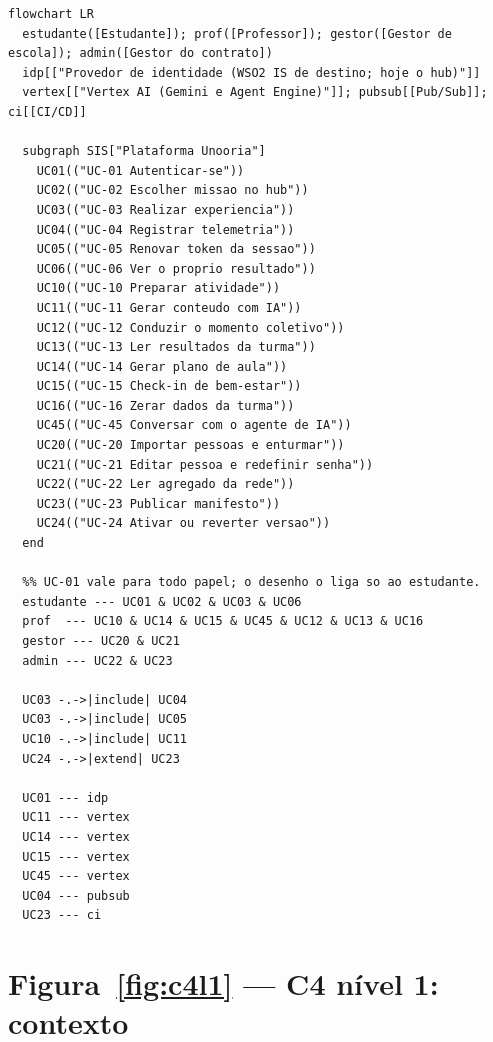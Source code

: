 \begin{lstlisting}[language=mermaid]
flowchart LR
  estudante([Estudante]); prof([Professor]); gestor([Gestor de escola]); admin([Gestor do contrato])
  idp[["Provedor de identidade (WSO2 IS de destino; hoje o hub)"]]
  vertex[["Vertex AI (Gemini e Agent Engine)"]]; pubsub[[Pub/Sub]]; ci[[CI/CD]]

  subgraph SIS["Plataforma Unooria"]
    UC01(("UC-01 Autenticar-se"))
    UC02(("UC-02 Escolher missao no hub"))
    UC03(("UC-03 Realizar experiencia"))
    UC04(("UC-04 Registrar telemetria"))
    UC05(("UC-05 Renovar token da sessao"))
    UC06(("UC-06 Ver o proprio resultado"))
    UC10(("UC-10 Preparar atividade"))
    UC11(("UC-11 Gerar conteudo com IA"))
    UC12(("UC-12 Conduzir o momento coletivo"))
    UC13(("UC-13 Ler resultados da turma"))
    UC14(("UC-14 Gerar plano de aula"))
    UC15(("UC-15 Check-in de bem-estar"))
    UC16(("UC-16 Zerar dados da turma"))
    UC45(("UC-45 Conversar com o agente de IA"))
    UC20(("UC-20 Importar pessoas e enturmar"))
    UC21(("UC-21 Editar pessoa e redefinir senha"))
    UC22(("UC-22 Ler agregado da rede"))
    UC23(("UC-23 Publicar manifesto"))
    UC24(("UC-24 Ativar ou reverter versao"))
  end

  %% UC-01 vale para todo papel; o desenho o liga so ao estudante.
  estudante --- UC01 & UC02 & UC03 & UC06
  prof  --- UC10 & UC14 & UC15 & UC45 & UC12 & UC13 & UC16
  gestor --- UC20 & UC21
  admin --- UC22 & UC23

  UC03 -.->|include| UC04
  UC03 -.->|include| UC05
  UC10 -.->|include| UC11
  UC24 -.->|extend| UC23

  UC01 --- idp
  UC11 --- vertex
  UC14 --- vertex
  UC15 --- vertex
  UC45 --- vertex
  UC04 --- pubsub
  UC23 --- ci
\end{lstlisting}

\section{Figura~\ref{fig:c4l1} --- C4 nível 1: contexto}


